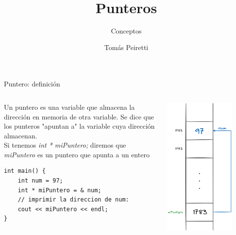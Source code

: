 \documentclass[12pt]{beamer}
\title{Punteros}
\subtitle{Conceptos}
\author{Tomás Peiretti}
\date{}
\begin{document}
\maketitle

\begin{frame}[fragile]{Puntero: definición}
    \begin{columns}
        \begin{column}{0.7\textwidth}
            Un puntero es una \alert{variable que almacena la dirección en memoria} de otra variable. 
            Se dice que los punteros "apuntan a" la variable cuya dirección almacenan. \\
            \medskip
            Si tenemos \textit{int \alert{*} miPuntero;} diremos que \textit{miPuntero} es un puntero que apunta a un entero
            \medskip
\begin{lstlisting}[basicstyle=\scriptsize]
int main() {
    int num = 97;
    int * miPuntero = & num;
    // imprimir la direccion de num:
    cout << miPuntero << endl;
}
\end{lstlisting}
        \end{column}
        \begin{column}{0.3\textwidth}
            \includegraphics[width=0.8\textwidth]{puntero.png}

\end{column}
\end{columns}
\end{frame}
\end{document}
